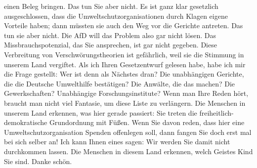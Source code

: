 \documentclass{article}
\begin{document}
einen Beleg bringen. Das tun Sie aber nicht. Es ist ganz klar gesetzlich ausgeschlossen, dass die Umweltschutzorganisationen durch Klagen eigene Vorteile haben; dann müssten sie auch den Weg vor die Gerichte antreten. Das tun sie aber nicht. Die AfD will das Problem also gar nicht lösen. Das Missbrauchspotenzial, das Sie ansprechen, ist gar nicht gegeben. Diese Verbreitung von Verschwörungstheorien ist gefährlich, weil sie die Stimmung in unserem Land vergiftet.  Als ich Ihren Gesetzentwurf gelesen habe, habe ich mir die Frage gestellt: Wer ist denn als Nächstes dran? Die unabhängigen Gerichte,  die die Deutsche Umwelthilfe bestätigen? Die Anwälte, die das machen? Die Gewerkschaften? Unabhängige Forschungsinstitute? Wenn man Ihre Reden hört, braucht man nicht viel Fantasie, um diese Liste zu verlängern.  Die Menschen in unserem Land erkennen, was hier gerade passiert: Sie treten die freiheitlich-demokratische Grundordnung mit Füßen.  Wenn Sie davon reden, dass hier eine Umweltschutzorganisation Spenden offenlegen soll, dann fangen Sie doch erst mal bei sich selber an!  Ich kann Ihnen eines sagen: Wir werden Sie damit nicht durchkommen lassen. Die Menschen in diesem Land erkennen, welch Geistes Kind Sie sind. Danke schön. 
\end{document}
